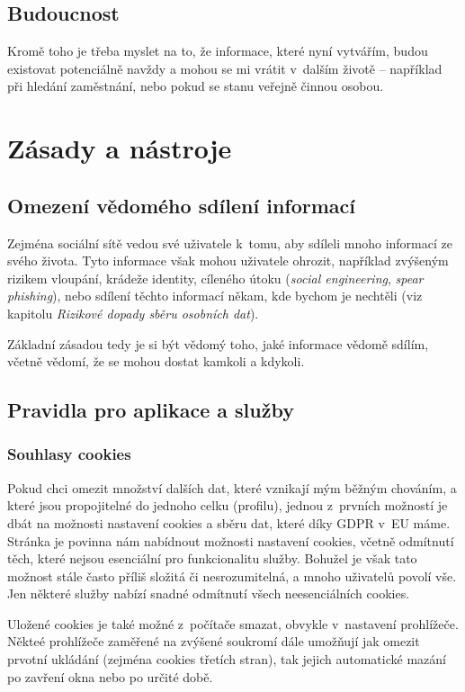 \subsection{Budoucnost}
Kromě toho je třeba myslet na to, že informace, které nyní vytvářím, budou existovat potenciálně navždy a mohou se mi vrátit v~dalším životě -- například při hledání zaměstnání, nebo pokud se stanu veřejně činnou osobou.


\section{Zásady a nástroje}

\subsection{Omezení vědomého sdílení informací}
Zejména sociální sítě vedou své uživatele k~tomu, aby sdíleli mnoho informací ze svého života. Tyto informace však mohou uživatele ohrozit, například zvýšeným rizikem vloupání, krádeže identity, cíleného útoku (\textit{social engineering}, \textit{spear phishing}), nebo sdílení těchto informací někam, kde bychom je nechtěli (viz kapitolu \textit{Rizikové dopady sběru osobních dat}).

Základní zásadou tedy je si být vědomý toho, jaké informace vědomě sdílím, včetně vědomí, že se mohou dostat kamkoli a kdykoli.

\subsection{Pravidla pro aplikace a služby}
\subsubsection*{Souhlasy cookies}

Pokud chci omezit množství dalších dat, které vznikají mým běžným chováním, a které jsou propojitelné do jednoho celku (profilu), jednou z~prvních možností je dbát na možnosti nastavení cookies a sběru dat, které díky GDPR v~EU máme. Stránka je povinna nám nabídnout možnosti nastavení cookies, včetně odmítnutí těch, které nejsou esenciální pro funkcionalitu služby.
Bohužel je však tato možnost stále často příliš složitá či nesrozumitelná, a mnoho uživatelů povolí vše. Jen některé služby nabízí snadné odmítnutí všech neesenciálních cookies. 

Uložené cookies je také možné z~počítače smazat, obvykle v~nastavení prohlížeče. Někteé prohlížeče zaměřené na zvýšené soukromí dále umožňují jak omezit prvotní ukládání (zejména cookies třetích stran), tak jejich automatické mazání po zavření okna nebo po určité době.

